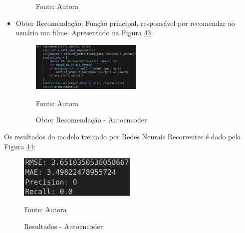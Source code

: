 \begin{itemize}
\begin{figure}[htbp]
        \vspace{2pt} %
        
        \small Fonte: Autora
    \end{figure}

    \item Obter Recomendação: Função principal, responsável por recomendar ao usuário um filme. Apresentado na Figura
    \hyperref[fig:recom-aut]{43}.
    \begin{figure}[htbp]
        \centering
        \caption{Obter Recomendação - Autoencoder}
        \label{fig:recom-aut}
        
        \vspace{2pt} %
        
        \includegraphics[width=0.5\textwidth]{figuras/recom-aut.eps}
        
        \vspace{2pt} %
        
        \small Fonte: Autora
    \end{figure}

\end{itemize}

Os resultados do modelo treinado por Redes Neurais Recorrentes é dado pela Figura \hyperref[fig:aut-5]{44}:
\begin{figure}[htbp]
    \centering
    \caption{Resultados - Autoencoder}
    \label{fig:aut-5}
    
    \vspace{2pt} %
    
    \includegraphics[width=0.5\textwidth]{figuras/aut-5.eps}
    
    \vspace{2pt} %
    
    \small Fonte: Autora
\end{figure}


